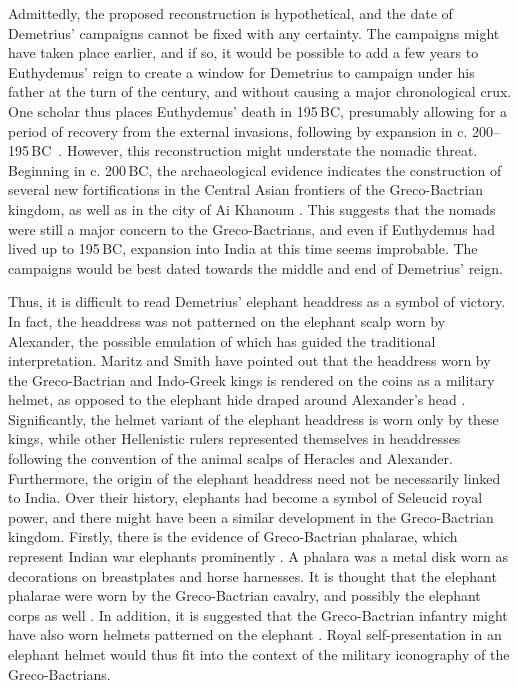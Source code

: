 \documentclass{ijsra}
\renewcommand\BC{{\,BC\xspace}}
\begin{document}
Admittedly, the proposed reconstruction is hypothetical, and the date of Demetrius’ campaigns cannot be fixed with any certainty.
The campaigns might have taken place earlier, and if so, it would be possible to add a few years to Euthydemus’ reign
to create a window for Demetrius to campaign under his father at the turn of the century,
and without causing a major chronological crux.
One scholar thus places Euthydemus’ death in 195\BC, presumably allowing for a period of recovery from the external invasions,
following by expansion in c. 200--195\BC\ \parencite[111]{Hollis2011}.
However, this reconstruction might understate the nomadic threat.
Beginning in c. 200\BC, the archaeological evidence indicates the construction of several new fortifications in the Central Asian
frontiers of the Greco-Bactrian kingdom, as well as in the city of Ai Khanoum \parencite[135]{Holt1999}.
This suggests that the nomads were still a major concern to the Greco-Bactrians, and even if Euthydemus had lived up to 195\BC,
expansion into India at this time seems improbable.
The campaigns would be best dated towards the middle and end of Demetrius’ reign.

Thus, it is difficult to read Demetrius’ elephant headdress as a symbol of victory.
In fact, the headdress was not patterned on the elephant scalp worn by Alexander,
the possible emulation of which has guided the traditional interpretation.
Maritz and Smith have pointed out that the headdress worn by the Greco-Bactrian and Indo-Greek kings is rendered on the coins
as a military helmet, as opposed to the elephant hide draped around Alexander’s head \parencites[48]{Maritz2004}[63]{Smith1986}.
Significantly, the helmet variant of the elephant headdress is worn only by these kings, while other Hellenistic rulers
represented themselves in headdresses following the convention of the animal scalps of Heracles and Alexander.
Furthermore, the origin of the elephant headdress need not be necessarily linked to India.
Over their history, elephants had become a symbol of Seleucid royal power, and there might have been a similar development in
the Greco-Bactrian kingdom.
Firstly, there is the evidence of Greco-Bactrian phalarae, which represent Indian war elephants prominently \parencite[1206--1211]{Bannikov2013}.
A phalara was a metal disk worn as decorations on breastplates and horse harnesses.
It is thought that the elephant phalarae were worn by the Greco-Bactrian cavalry, and possibly the elephant corps as well 
\parencites[1206--1211]{Bannikov2013}[10]{Pfrommer1993}[588]{Treister1999}.
In addition, it is suggested that the Greco-Bactrian infantry might have also worn helmets patterned on the elephant \parencite[163--180]{Abdullaev1995}.
Royal self-presentation in an elephant helmet would thus fit into the context of the military iconography of the Greco-Bactrians.
\end{document}
